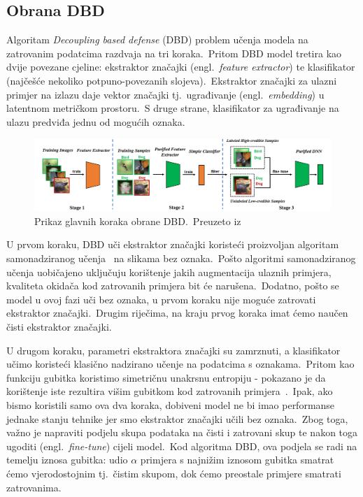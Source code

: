\documentclass[diplomskirad]{fer}
\begin{document}
\subsection{Obrana DBD}
\label{sub:dbd}

Algoritam \textit{Decoupling based defense} (DBD) problem učenja modela na zatrovanim podatcima razdvaja na tri koraka.\ 
Pritom DBD model tretira kao dvije povezane cjeline: ekstraktor značajki (engl.\ \textit{feature extractor}) te klasifikator (najčešće nekoliko potpuno-povezanih slojeva).\  
Ekstraktor značajki za ulazni primjer na izlazu daje vektor značajki tj.\ ugrađivanje (engl.\ \textit{embedding}) u latentnom metričkom prostoru.\ 
S druge strane, klasifikator za ugrađivanje na ulazu predviđa jednu od mogućih oznaka.\

\begin{figure}[h]
  \centering
  \includegraphics[scale=0.65]{./Slike/dbd.png}
  \caption{Prikaz glavnih koraka obrane DBD.\ Preuzeto iz\cite{huang2022backdoor}}
  \label{fig:dbd}
\end{figure}
  
U prvom koraku, DBD uči ekstraktor značajki koristeći proizvoljan algoritam samonadziranog učenja~\cite{jaiswal2020survey} na slikama bez oznaka.\ 
Pošto algoritmi samonadziranog učenja uobičajeno uključuju korištenje jakih augmentacija ulaznih primjera, kvaliteta okidača kod zatrovanih primjera bit će narušena.\ 
Dodatno, pošto se model u ovoj fazi uči bez oznaka, u prvom koraku nije moguće zatrovati ekstraktor značajki.\ Drugim riječima, na kraju prvog koraka imat ćemo naučen čisti ekstraktor značajki.\ 

U drugom koraku, parametri ekstraktora značajki su zamrznuti, a klasifikator učimo koristeći klasično nadzirano učenje na podatcima s oznakama.\ 
Pritom kao funkciju gubitka koristimo simetričnu unakrsnu entropiju - pokazano je da korištenje iste rezultira višim gubitkom kod zatrovanih primjera~\cite{wang2019symmetric}.\ 
Ipak, ako bismo koristili samo ova dva koraka, dobiveni model ne bi imao performanse jednake stanju tehnike jer smo ekstraktor značajki učili bez oznaka.\ 
Zbog toga, važno je napraviti podjelu skupa podataka na čisti i zatrovani skup te nakon toga ugoditi (engl.\ \textit{fine-tune}) cijeli model.\ 
Kod algoritma DBD, ova podjela se radi na temelju iznosa gubitka: udio $\alpha$ primjera s najnižim iznosom gubitka smatrat ćemo vjerodostojnim tj.\ čistim skupom, dok ćemo preostale primjere smatrati zatrovanima.\ 
\end{document}
